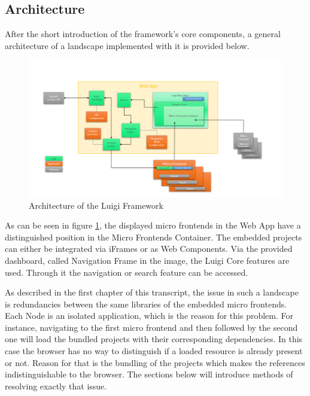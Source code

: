 \subsection{Architecture}

After the short introduction of the framework's core components, a general architecture of a landscape implemented with it is provided below.

\begin{figure}[!h]
	\centering
	\includegraphics[width=1.05\textwidth]{Figures/Luigi_Architektur.png}
	\caption{Architecture of the Luigi Framework \cite{luigi_architecture}}
	\label{fig:luigi_architecture_fig}
\end{figure}

As can be seen in figure \ref{fig:luigi_architecture_fig}, the displayed micro frontends in the Web App have a distinguished position in the Micro Frontends Container. The embedded projects can either be integrated via iFrames or as Web Components.
Via the provided dashboard, called Navigation Frame in the image, the Luigi Core features are used. Through it the navigation or search feature can be accessed.

As described in the first chapter of this transcript, the issue in such a landscape is redundancies between the same libraries of the embedded micro frontends. Each Node is an isolated application, which is the reason for this problem.
For instance, navigating to the first micro frontend and then followed by the second one will load the bundled projects with their corresponding dependencies. In this case the browser has no way to distinguish if a loaded resource is already present or not. Reason for that is the bundling of the projects which makes the references indistinguishable to the browser.
The sections below will introduce methods of resolving exactly that issue. 

